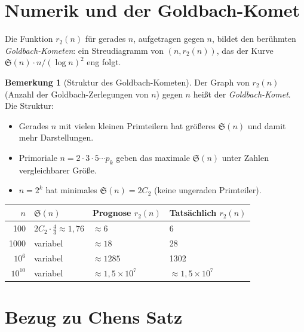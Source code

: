 \documentclass[12pt,a4paper]{amsart}
\theoremstyle{definition}
\newtheorem{bemerkung}[theorem]{Bemerkung}
\begin{document}
\section{Numerik und der Goldbach-Komet}
\label{sec:komet}

Die Funktion $r_2(n)$ für gerades $n$, aufgetragen gegen $n$, bildet den
berühmten \emph{Goldbach-Kometen}: ein Streudiagramm von $(n, r_2(n))$, das
der Kurve $\mathfrak{S}(n) \cdot n / (\log n)^2$ eng folgt.

\begin{bemerkung}[Struktur des Goldbach-Kometen]
  Der Graph von $r_2(n)$ (Anzahl der Goldbach-Zerlegungen von $n$) gegen
  $n$ heißt der \emph{Goldbach-Komet}.  Die Struktur:
  \begin{itemize}
    \item Gerades $n$ mit vielen kleinen Primteilern hat größeres
      $\mathfrak{S}(n)$ und damit mehr Darstellungen.
    \item Primoriale $n = 2 \cdot 3 \cdot 5 \cdots p_k$ geben das
      maximale $\mathfrak{S}(n)$ unter Zahlen vergleichbarer Größe.
    \item $n = 2^k$ hat minimales $\mathfrak{S}(n) = 2C_2$ (keine
      ungeraden Primteiler).
  \end{itemize}
\end{bemerkung}

\begin{center}
\begin{tabular}{rlll}
\toprule
$n$ & $\mathfrak{S}(n)$ & Prognose $r_2(n)$ & Tatsächlich $r_2(n)$ \\
\midrule
100    & $2C_2 \cdot \tfrac{4}{3} \approx 1{,}76$ & $\approx 6$ & 6 \\
1000   & variabel & $\approx 18$ & 28 \\
$10^6$ & variabel & $\approx 1285$ & 1302 \\
$10^{10}$ & variabel & $\approx 1{,}5\times 10^7$ & $\approx 1{,}5\times 10^7$ \\
\bottomrule
\end{tabular}
\end{center}

\section{Bezug zu Chens Satz}
\label{sec:chen}
\end{document}
